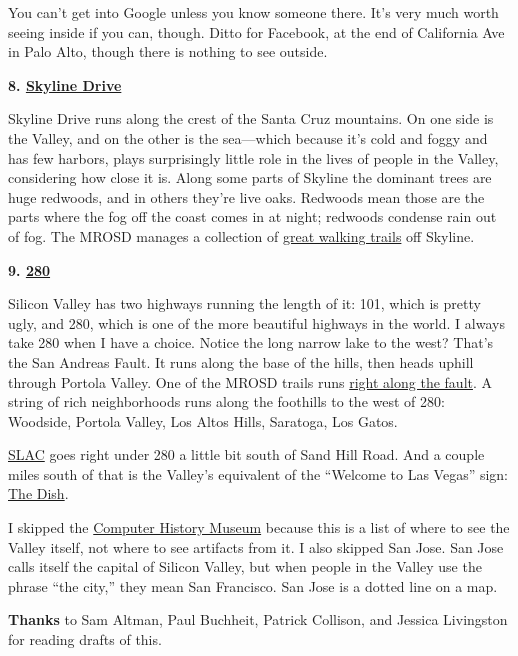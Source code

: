 \documentclass[12pt]{book}
\begin{document}
You can't get into Google unless you know someone there. It's very much
worth seeing inside if you can, though. Ditto for Facebook, at the end
of California Ave in Palo Alto, though there is nothing to see outside.

\textbf{8. \href{http://maps.google.com/maps?q=skylonda}{Skyline Drive}}

Skyline Drive runs along the crest of the Santa Cruz mountains. On one
side is the Valley, and on the other is the sea---which because it's
cold and foggy and has few harbors, plays surprisingly little role in
the lives of people in the Valley, considering how close it is. Along
some parts of Skyline the dominant trees are huge redwoods, and in
others they're live oaks. Redwoods mean those are the parts where the
fog off the coast comes in at night; redwoods condense rain out of fog.
The MROSD manages a collection of \href{http://www.openspace.org/}{great
walking trails} off Skyline.

\textbf{9.
\href{http://maps.google.com/maps?q=interstate+280+san+mateo}{280}}

Silicon Valley has two highways running the length of it: 101, which is
pretty ugly, and 280, which is one of the more beautiful highways in the
world. I always take 280 when I have a choice. Notice the long narrow
lake to the west? That's the San Andreas Fault. It runs along the base
of the hills, then heads uphill through Portola Valley. One of the MROSD
trails runs
\href{http://www.openspace.org/preserves/pr_los_trancos.asp}{right along
the fault}. A string of rich neighborhoods runs along the foothills to
the west of 280: Woodside, Portola Valley, Los Altos Hills, Saratoga,
Los Gatos.

\href{http://www.flickr.com/photos/38037974@N00/3890299362/}{SLAC} goes
right under 280 a little bit south of Sand Hill Road. And a couple miles
south of that is the Valley's equivalent of the ``Welcome to Las Vegas''
sign: \href{http://www.flickr.com/photos/paulbarroga/3443486941/}{The
Dish}.


I skipped the \href{http://www.computerhistory.org/}{Computer History
Museum} because this is a list of where to see the Valley itself, not
where to see artifacts from it. I also skipped San Jose. San Jose calls
itself the capital of Silicon Valley, but when people in the Valley use
the phrase ``the city,'' they mean San Francisco. San Jose is a dotted
line on a map.

\textbf{Thanks} to Sam Altman, Paul Buchheit, Patrick Collison, and
Jessica Livingston for reading drafts of this.
\end{document}
